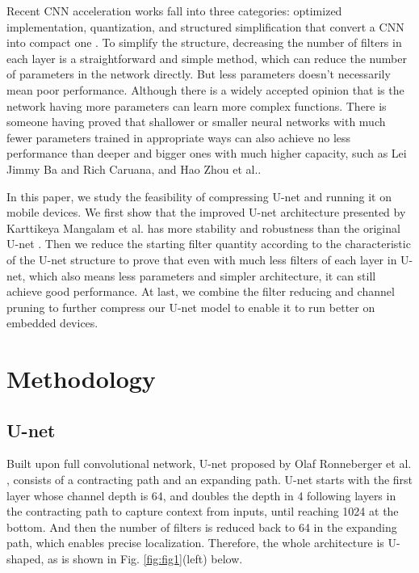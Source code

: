 \documentclass[sigconf]{acmart}
\begin{document}
Recent CNN acceleration works fall into three categories: optimized implementation, quantization, and structured simplification that convert a CNN into compact one \cite{channel-pruning}. To simplify the structure, decreasing the number of filters in each layer is a straightforward and simple method, which can reduce the number of parameters in the network directly. But less parameters doesn't necessarily mean poor performance. Although there is a widely accepted opinion that is the network having more parameters can learn more complex functions. There is someone having proved that shallower or smaller neural networks with much fewer parameters trained in appropriate ways can also achieve no less performance than deeper and bigger ones with much higher capacity, such as Lei Jimmy Ba and Rich Caruana\cite{really-need-to-be-deep}, and Hao Zhou et al.\cite{less-is-more}.

In this paper, we study the feasibility of compressing U-net and running it on mobile devices. We first show that the improved U-net architecture presented by Karttikeya Mangalam et al.\cite{improved-unet} has more stability and robustness than the original U-net . Then we reduce the starting filter quantity according to the characteristic of the U-net structure to prove that even with much less filters of each layer in U-net, which also means less parameters and simpler architecture, it can still achieve good performance. At last, we combine the filter reducing and channel pruning to further compress our U-net model to enable it to run better on embedded devices.

\section{Methodology}
\subsection{U-net}
Built upon full convolutional network\cite{fcl4seg}, U-net proposed by Olaf Ronneberger et al.\cite{unet} , consists of a contracting path and an expanding path. U-net starts with the first layer whose channel depth is 64, and doubles the depth in 4 following layers in the contracting path to capture context from inputs, until reaching 1024 at the bottom. And then the number of filters is reduced back to 64 in the expanding path, which enables precise localization. Therefore, the whole architecture is U-shaped, as is shown in Fig. \ref{fig:fig1}(left) below. 
\end{document}
